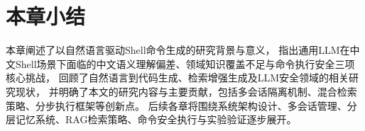 \section{本章小结}

本章阐述了以自然语言驱动Shell命令生成的研究背景与意义，
指出通用LLM在中文Shell场景下面临的中文语义理解偏差、领域知识覆盖不足与命令执行安全三项核心挑战，
回顾了自然语言到代码生成、检索增强生成及LLM安全领域的相关研究现状，
并明确了本文的研究内容与主要贡献，包括多会话隔离机制、混合检索策略、分步执行框架等创新点。
后续各章将围绕系统架构设计、多会话管理、分层记忆系统、RAG检索策略、命令安全执行与实验验证逐步展开。



